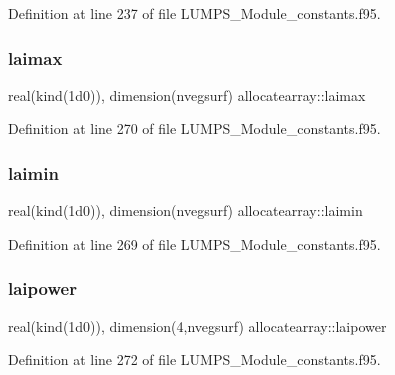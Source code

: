Definition at line 237 of file L\+U\+M\+P\+S\+\_\+\+Module\+\_\+constants.\+f95.

\mbox{\label{namespaceallocatearray_a535874e25b1042564b17301e8d84147b}} 
\subsubsection{\texorpdfstring{laimax}{laimax}}
{\footnotesize\ttfamily real(kind(1d0)), dimension(nvegsurf) allocatearray\+::laimax}



Definition at line 270 of file L\+U\+M\+P\+S\+\_\+\+Module\+\_\+constants.\+f95.

\mbox{\label{namespaceallocatearray_ab3f65c4c4c46b200d0e63121b457d7c4}} 
\subsubsection{\texorpdfstring{laimin}{laimin}}
{\footnotesize\ttfamily real(kind(1d0)), dimension(nvegsurf) allocatearray\+::laimin}



Definition at line 269 of file L\+U\+M\+P\+S\+\_\+\+Module\+\_\+constants.\+f95.

\mbox{\label{namespaceallocatearray_a223428e8ad63f23758c195a04032b6cc}} 
\subsubsection{\texorpdfstring{laipower}{laipower}}
{\footnotesize\ttfamily real(kind(1d0)), dimension(4,nvegsurf) allocatearray\+::laipower}



Definition at line 272 of file L\+U\+M\+P\+S\+\_\+\+Module\+\_\+constants.\+f95.

\mbox{\label{namespaceallocatearray_a6f2feef0f1dc416e159eaa33bf07019e}} 
